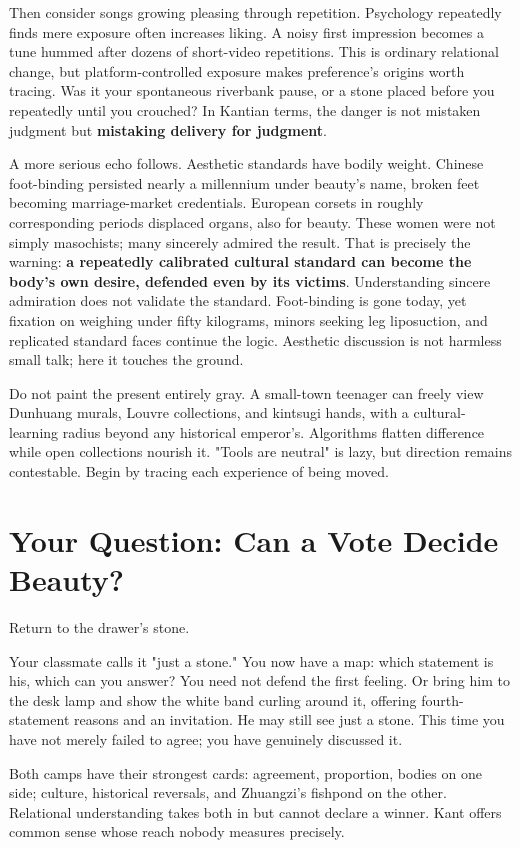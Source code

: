 Then consider songs growing pleasing through repetition. Psychology repeatedly finds mere exposure often increases liking. A noisy first impression becomes a tune hummed after dozens of short-video repetitions. This is ordinary relational change, but platform-controlled exposure makes preference's origins worth tracing. Was it your spontaneous riverbank pause, or a stone placed before you repeatedly until you crouched? In Kantian terms, the danger is not mistaken judgment but \textbf{mistaking delivery for judgment}.

A more serious echo follows. Aesthetic standards have bodily weight. Chinese foot-binding persisted nearly a millennium under beauty's name, broken feet becoming marriage-market credentials. European corsets in roughly corresponding periods displaced organs, also for beauty. These women were not simply masochists; many sincerely admired the result. That is precisely the warning: \textbf{a repeatedly calibrated cultural standard can become the body's own desire, defended even by its victims}. Understanding sincere admiration does not validate the standard. Foot-binding is gone today, yet fixation on weighing under fifty kilograms, minors seeking leg liposuction, and replicated standard faces continue the logic. Aesthetic discussion is not harmless small talk; here it touches the ground.

Do not paint the present entirely gray. A small-town teenager can freely view Dunhuang murals, Louvre collections, and kintsugi hands, with a cultural-learning radius beyond any historical emperor's. Algorithms flatten difference while open collections nourish it. "Tools are neutral" is lazy, but direction remains contestable. Begin by tracing each experience of being moved.

\section{Your Question: Can a Vote Decide Beauty?}
Return to the drawer's stone.

Your classmate calls it "just a stone." You now have a map: which statement is his, which can you answer? You need not defend the first feeling. Or bring him to the desk lamp and show the white band curling around it, offering fourth-statement reasons and an invitation. He may still see just a stone. This time you have not merely failed to agree; you have genuinely discussed it.

Both camps have their strongest cards: agreement, proportion, bodies on one side; culture, historical reversals, and Zhuangzi's fishpond on the other. Relational understanding takes both in but cannot declare a winner. Kant offers common sense whose reach nobody measures precisely.

